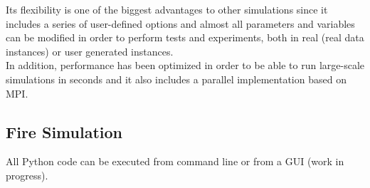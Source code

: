 \documentclass[11pt]{article}
\begin{document}
Its flexibility is one of the biggest advantages to other simulations since it includes a series of user-defined options and almost all parameters and variables can be modified in order to perform tests and experiments, both in real (real data instances) or user generated instances. \\

In addition, performance has been optimized in order to be able to run large-scale simulations in seconds and it also includes a parallel implementation based on MPI. 

\subsection{Fire Simulation}
	All Python code can be executed from command line or from a GUI (work in progress).
	
\end{document}
